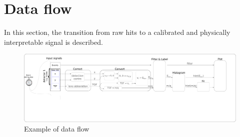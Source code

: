\section{Data flow}
In this section, the transition from raw hits to a calibrated and physically interpretable signal is described. 

\begin{figure}[h]
   \centering
    \centerline{\includegraphics[width=1\textwidth]{Graphics/data_flow.pdf}}
\caption{Example of data flow}
\label{Data_flow}
\end{figure}
